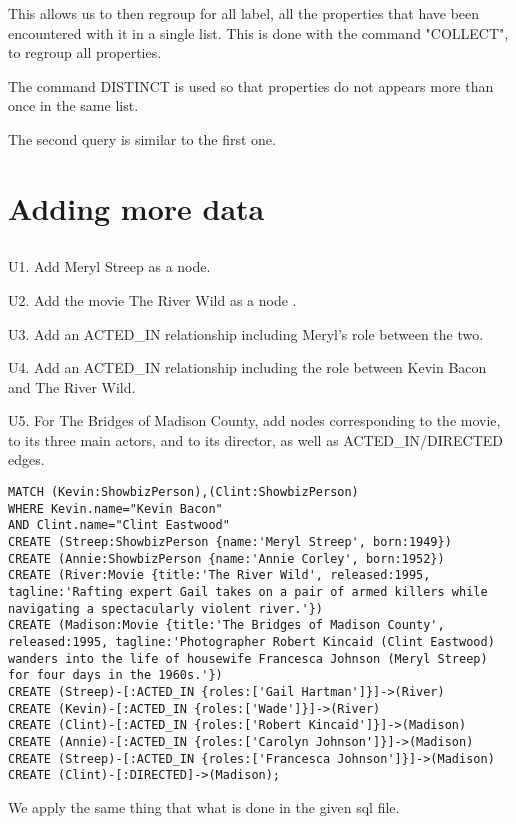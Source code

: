 This allows us to then regroup for all label, all the properties that have been encountered with it in a single list. This is done with the command "COLLECT", to regroup all properties.

The command DISTINCT is used so that properties do not appears more than once in the same list.

The second query is similar to the first one.

\section{Adding more data}
\subsection{}
U1. Add Meryl Streep as a node.

U2. Add the movie The River Wild as a node .

U3. Add an ACTED\_IN relationship including Meryl’s role between the two.

U4. Add an ACTED\_IN relationship including the role between Kevin Bacon and The River Wild.

U5. For The Bridges of Madison County, add nodes corresponding to the movie, to its three main actors, and to its director, as well as ACTED\_IN/DIRECTED edges.

\begin{verbatim}
MATCH (Kevin:ShowbizPerson),(Clint:ShowbizPerson)
WHERE Kevin.name="Kevin Bacon"
AND Clint.name="Clint Eastwood"
CREATE (Streep:ShowbizPerson {name:'Meryl Streep', born:1949})
CREATE (Annie:ShowbizPerson {name:'Annie Corley', born:1952})
CREATE (River:Movie {title:'The River Wild', released:1995, tagline:'Rafting expert Gail takes on a pair of armed killers while navigating a spectacularly violent river.'})
CREATE (Madison:Movie {title:'The Bridges of Madison County', released:1995, tagline:'Photographer Robert Kincaid (Clint Eastwood) wanders into the life of housewife Francesca Johnson (Meryl Streep) for four days in the 1960s.'})
CREATE (Streep)-[:ACTED_IN {roles:['Gail Hartman']}]->(River)
CREATE (Kevin)-[:ACTED_IN {roles:['Wade']}]->(River)
CREATE (Clint)-[:ACTED_IN {roles:['Robert Kincaid']}]->(Madison)
CREATE (Annie)-[:ACTED_IN {roles:['Carolyn Johnson']}]->(Madison)
CREATE (Streep)-[:ACTED_IN {roles:['Francesca Johnson']}]->(Madison)
CREATE (Clint)-[:DIRECTED]->(Madison);
\end{verbatim}

We apply the same thing that what is done in the given sql file.

